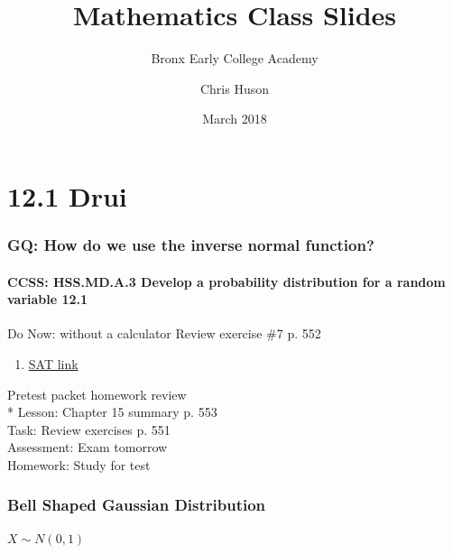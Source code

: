\documentclass{beamer}
\title{Mathematics Class Slides}
\subtitle{Bronx Early College Academy}
\author{Chris Huson}
\date{March 2018}
\begin{document}
\frame{\titlepage}


\section{12.1 Drui}
\frame
{
  \frametitle{GQ: How do we use the inverse normal function?}
  \framesubtitle{CCSS: HSS.MD.A.3 Develop a probability distribution for a random variable \qquad \alert{12.1}}

  \begin{block}{Do Now: \alert{without a calculator} Review exercise \#7 p. 552}
    \begin{enumerate}
    \item \href{https://blog.prepscholar.com/sat-standard-deviation}{SAT link}
    \end{enumerate}
 \end{block}
  Pretest packet homework review\\*
  Lesson: Chapter 15 summary p. 553\\%
  Task: Review exercises p. 551\\%
  Assessment: Exam tomorrow\\%
  Homework: Study for test
}

\frame
{
  \frametitle{Bell Shaped Gaussian Distribution}
    \framesubtitle{$X \sim N(0, 1)$}
\begin{figure}
\begin{center}
\end{center}
\end{figure}

}
\end{document}
